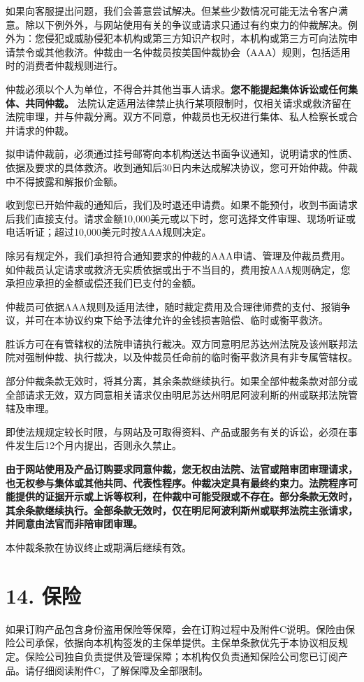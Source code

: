 \documentclass[UTF8,fontset=none,11pt,a4paper]{ctexart}
\begin{document}
如果向客服提出问题，我们会善意尝试解决。但某些少数情况可能无法令客户满意。除以下例外外，与网站使用有关的争议或请求只通过有约束力的仲裁解决。例外为：您侵犯或威胁侵犯本机构或第三方知识产权时，本机构或第三方可向法院申请禁令或其他救济。仲裁由一名仲裁员按美国仲裁协会（AAA）规则，包括适用时的消费者仲裁规则进行。


仲裁必须以个人为单位，不得合并其他当事人请求。\textbf{您不能提起集体诉讼或任何集体、共同仲裁。} 法院认定适用法律禁止执行某项限制时，仅相关请求或救济留在法院审理，并与仲裁分离。双方不同意，仲裁员也无权进行集体、私人检察长或合并请求的仲裁。


拟申请仲裁前，必须通过挂号邮寄向本机构送达书面争议通知，说明请求的性质、依据及要求的具体救济。收到通知后30日内未达成解决协议，您可开始仲裁。仲裁中不得披露和解报价金额。


收到您已开始仲裁的通知后，我们及时退还申请费。如果不能预付，收到书面请求后我们直接支付。请求金额10,000美元或以下时，您可选择文件审理、现场听证或电话听证；超过10,000美元时按AAA规则决定。


除另有规定外，我们承担符合通知要求的仲裁的AAA申请、管理及仲裁员费用。如仲裁员认定请求或救济无实质依据或出于不当目的，费用按AAA规则确定，您承担应承担的金额或偿还我们已支付的金额。


仲裁员可依据AAA规则及适用法律，随时裁定费用及合理律师费的支付、报销争议，并可在本协议约束下给予法律允许的金钱损害赔偿、临时或衡平救济。


胜诉方可在有管辖权的法院申请执行裁决。双方同意明尼苏达州法院及该州联邦法院对强制仲裁、执行裁决，以及仲裁员任命前的临时衡平救济具有非专属管辖权。


部分仲裁条款无效时，将其分离，其余条款继续执行。如果全部仲裁条款对部分或全部请求无效，双方同意相关请求仅由明尼苏达州明尼阿波利斯的州或联邦法院管辖及审理。


即使法规规定较长时限，与网站及可取得资料、产品或服务有关的诉讼，必须在事件发生后12个月内提出，否则永久禁止。


\textbf{由于网站使用及产品订购要求同意仲裁，您无权由法院、法官或陪审团审理请求，也无权参与集体或其他共同、代表性程序。仲裁决定具有最终约束力。法院程序可能提供的证据开示或上诉等权利，在仲裁中可能受限或不存在。部分条款无效时，其余条款继续执行。全部条款无效时，仅在明尼阿波利斯州或联邦法院主张请求，并同意由法官而非陪审团审理。}


本仲裁条款在协议终止或期满后继续有效。


\section*{14. 保险}
如果订购产品包含身份盗用保险等保障，会在订购过程中及附件C说明。保险由保险公司承保，依据向本机构签发的主保单提供。主保单条款优先于本协议相反规定。保险公司独自负责提供及管理保障；本机构仅负责通知保险公司您已订阅产品。请仔细阅读附件C，了解保障及全部限制。
\end{document}
